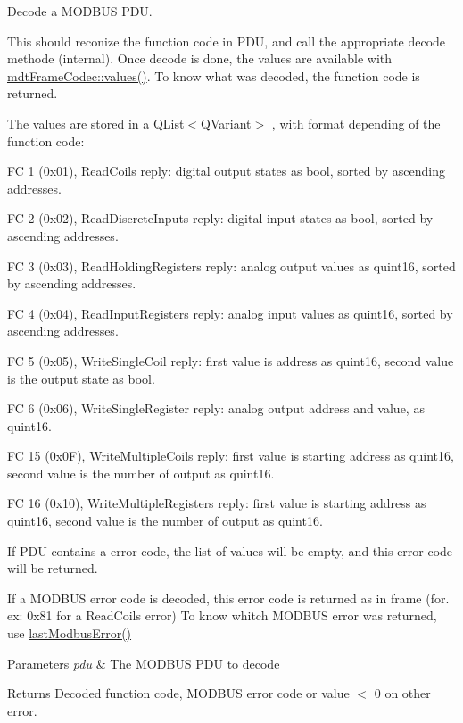 Decode a MODBUS PDU. 

This should reconize the function code in PDU, and call the appropriate decode methode (internal). Once decode is done, the values are available with \hyperlink{classmdt_frame_codec_a2c0cc0f9d9b72ef2295b7ec7eca72ea7}{mdtFrameCodec::values()}. To know what was decoded, the function code is returned.

The values are stored in a QList$<$QVariant$>$ , with format depending of the function code:
\begin{DoxyItemize}
\item FC 1 (0x01), ReadCoils reply: digital output states as bool, sorted by ascending addresses.
\item FC 2 (0x02), ReadDiscreteInputs reply: digital input states as bool, sorted by ascending addresses.
\item FC 3 (0x03), ReadHoldingRegisters reply: analog output values as quint16, sorted by ascending addresses.
\item FC 4 (0x04), ReadInputRegisters reply: analog input values as quint16, sorted by ascending addresses.
\item FC 5 (0x05), WriteSingleCoil reply: first value is address as quint16, second value is the output state as bool.
\item FC 6 (0x06), WriteSingleRegister reply: analog output address and value, as quint16.
\item FC 15 (0x0F), WriteMultipleCoils reply: first value is starting address as quint16, second value is the number of output as quint16.
\item FC 16 (0x10), WriteMultipleRegisters reply: first value is starting address as quint16, second value is the number of output as quint16.
\end{DoxyItemize}

If PDU contains a error code, the list of values will be empty, and this error code will be returned.

If a MODBUS error code is decoded, this error code is returned as in frame (for. ex: 0x81 for a ReadCoils error) To know whitch MODBUS error was returned, use \hyperlink{classmdt_frame_codec_modbus_a21f3102e12f1a1d9c4145c1ce1f8e6b6}{lastModbusError()}


\begin{DoxyParams}{Parameters}
{\em pdu} & The MODBUS PDU to decode \\
\hline
\end{DoxyParams}
\begin{DoxyReturn}{Returns}
Decoded function code, MODBUS error code or value $<$ 0 on other error. 
\end{DoxyReturn}


